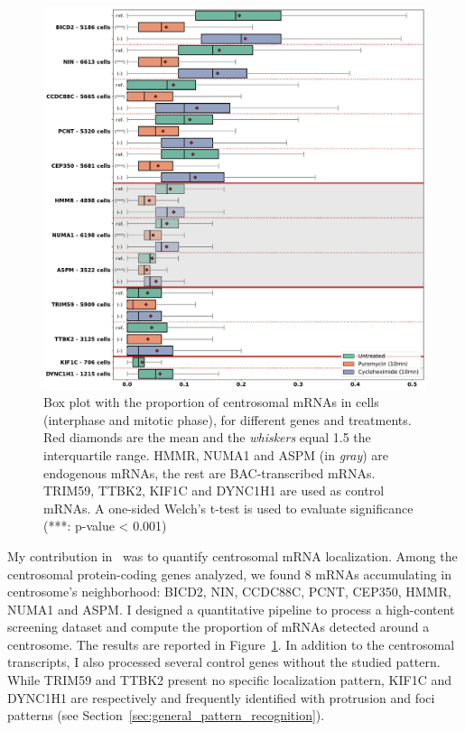 \begin{figure}[]
    \centering
    \includegraphics[width=\textwidth]{figures/chapter5/plot_rna_centrosome}
    \caption[Box plot with the proportion of centrosomal mRNAs]{Box plot with the proportion of centrosomal mRNAs in cells (interphase and mitotic phase), for different genes and treatments.
	Red diamonds are the mean and the \textit{whiskers} equal 1.5 the interquartile range.
	HMMR, NUMA1 and ASPM (in \textit{gray}) are endogenous mRNAs, the rest are BAC-transcribed mRNAs.
	TRIM59, TTBK2, KIF1C and DYNC1H1 are used as control mRNAs.
	A one-sided Welch’s t-test is used to evaluate significance (***: p-value < 0.001)}
    \label{fig:plot_rna_centrosome}
\end{figure}

My contribution in~\cite{safieddine_choreography_2021} was to quantify centrosomal \ac{mRNA} localization.
Among the centrosomal protein-coding genes analyzed, we found 8 \ac{mRNA}s accumulating in centrosome's neighborhood: BICD2, NIN, CCDC88C, PCNT, CEP350, HMMR, NUMA1 and ASPM.
I designed a quantitative pipeline to process a high-content screening dataset and compute the proportion of \ac{mRNA}s detected around a centrosome.
The results are reported in Figure~\ref{fig:plot_rna_centrosome}.
In addition to the centrosomal transcripts, I also processed several control genes without the studied pattern.
While TRIM59 and TTBK2 present no specific localization pattern, KIF1C and DYNC1H1 are respectively and frequently identified with protrusion and foci patterns (see Section~\ref{sec:general_pattern_recognition}).

